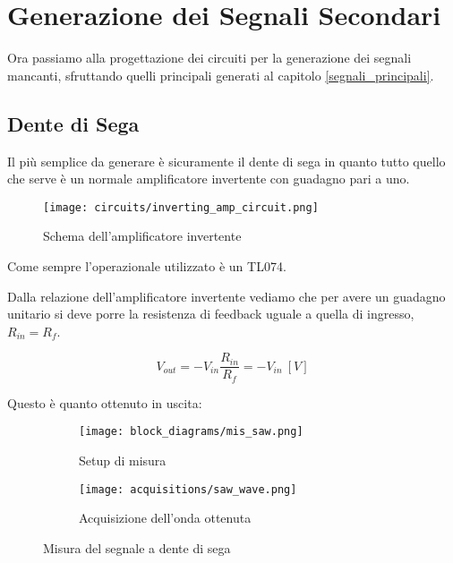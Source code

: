 \chapter{Generazione dei Segnali Secondari}\label{segnali_secondari}


Ora passiamo alla progettazione dei circuiti per la generazione dei segnali mancanti, sfruttando
quelli principali generati al capitolo \ref{segnali_principali}.


\section{Dente di Sega}


Il più semplice da generare è sicuramente il dente di sega in quanto tutto quello che serve è un
normale amplificatore invertente con guadagno pari a uno.

\begin{figure}[H]
    \centering
    \texttt{[image: circuits/inverting\_amp\_circuit.png]}
    \caption{Schema dell'amplificatore invertente}
    \label{inverting_amp_circuit}
\end{figure}

Come sempre l'operazionale utilizzato è un TL074.

Dalla relazione dell'amplificatore invertente vediamo che per avere un guadagno unitario si
deve porre la resistenza di feedback uguale a quella di ingresso, $R_{in}=R_f$.

\begin{equation}
    V_{out}=-V_{in}\frac{R_{in}}{R_f}=-V_{in}\ [V]
\end{equation}

Questo è quanto ottenuto in uscita:

\begin{figure}[H]
    \centering

    \begin{subfigure}{.5\textwidth}
        \centering
        \texttt{[image: block\_diagrams/mis\_saw.png]}
        \caption{Setup di misura}
        \label{mis_saw}
    \end{subfigure}%
    \begin{subfigure}{.5\textwidth}
        \centering
        \texttt{[image: acquisitions/saw\_wave.png]}
        \caption{Acquisizione dell'onda ottenuta}
        \label{acq_saw}
    \end{subfigure}

    \caption{Misura del segnale a dente di sega}
\end{figure}

